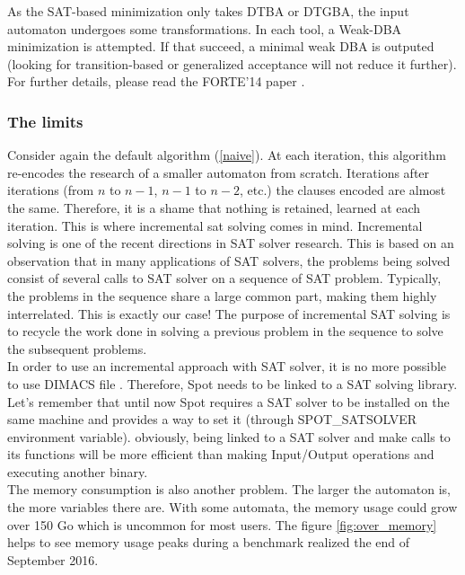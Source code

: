 \noindent As the SAT-based minimization only takes DTBA or DTGBA, the input automaton undergoes some
transformations. In each tool, a Weak-DBA minimization is attempted. If that succeed, a minimal weak DBA
is outputed (looking for transition-based or generalized acceptance will not reduce it further). For
further details, please read the FORTE'14 paper \cite{14}.

\subsubsection{The limits}
Consider again the default algorithm (\ref{naive}).
At each iteration, this algorithm re-encodes the research of a smaller automaton from scratch. Iterations
after iterations (from $n$ to $n-1$, $n-1$ to $n-2$, etc.) the clauses encoded are almost the same.
Therefore, it is a shame that nothing is retained, learned at each iteration. This is where incremental sat
solving comes in mind. Incremental solving is one of the recent directions in SAT solver research. This is
based on an observation that in many applications of SAT solvers, the problems being solved consist of
several calls to SAT solver on a sequence of SAT problem. Typically, the problems in the sequence share a
large common part, making them highly interrelated. This is exactly our case! The purpose of incremental
SAT solving is to recycle the work done in solving a previous problem in the sequence to solve the
subsequent problems.\\

In order to use an incremental approach with SAT solver, it is no more possible to use DIMACS file
\cite{18}. Therefore, Spot needs to be linked to a SAT solving library. Let's remember that until now
Spot requires a SAT solver to be installed on the same machine and provides a way to set it (through
SPOT\_SATSOLVER environment variable). obviously, being linked to a SAT solver and make calls to its
functions will be more efficient than making Input/Output operations and executing another binary.\\

The memory consumption is also another problem. The larger the automaton is, the more variables there are.
With some automata, the memory usage could grow over 150 Go which is uncommon for most users. The figure
\ref{fig:over_memory} helps to see memory usage peaks during a benchmark realized the end of September
2016.\\

